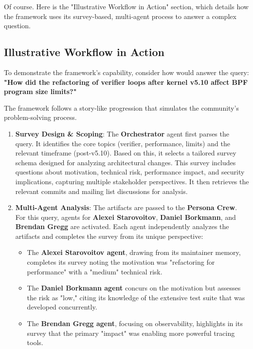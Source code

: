 Of course. Here is the "Illustrative Workflow in Action" section, which details how the \sys framework uses its survey-based, multi-agent process to answer a complex question.


\subsection{Illustrative Workflow in Action}

To demonstrate the framework's capability, consider how \sys would answer the query: \textbf{"How did the refactoring of verifier loops after kernel v5.10 affect BPF program size limits?"}

The framework follows a story-like progression that simulates the community's problem-solving process.

\begin{enumerate}
\item \textbf{Survey Design \& Scoping}: The \textbf{Orchestrator} agent first parses the query. It identifies the core topics (verifier, performance, limits) and the relevant timeframe (post-v5.10). Based on this, it selects a tailored survey schema designed for analyzing architectural changes. This survey includes questions about motivation, technical risk, performance impact, and security implications, capturing multiple stakeholder perspectives. It then retrieves the relevant commits and mailing list discussions for analysis.

\item \textbf{Multi-Agent Analysis}: The artifacts are passed to the \textbf{Persona Crew}. For this query, agents for \textbf{Alexei Starovoitov}, \textbf{Daniel Borkmann}, and \textbf{Brendan Gregg} are activated. Each agent independently analyzes the artifacts and completes the survey from its unique perspective:
    \begin{itemize}
    \item The \textbf{Alexei Starovoitov agent}, drawing from its maintainer memory, completes its survey noting the motivation was "refactoring for performance" with a "medium" technical risk.
    \item The \textbf{Daniel Borkmann agent} concurs on the motivation but assesses the risk as "low," citing its knowledge of the extensive test suite that was developed concurrently.
    \item The \textbf{Brendan Gregg agent}, focusing on observability, highlights in its survey that the primary "impact" was enabling more powerful tracing tools.
    \end{itemize}


\end{enumerate}
